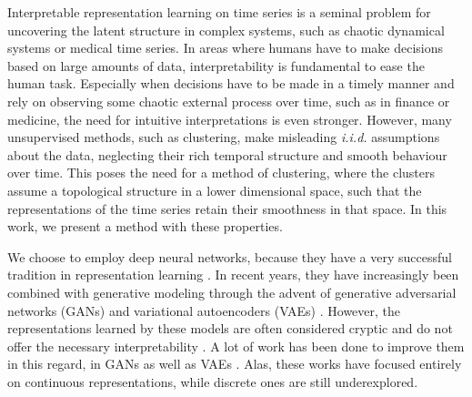 Interpretable representation learning on time series is a seminal problem for uncovering the latent structure in complex systems, such as chaotic dynamical systems or medical time series.
In areas where humans have to make decisions based on large amounts of data, interpretability is fundamental to ease the human task.
Especially when decisions have to be made in a timely manner and rely on observing some chaotic external process over time, such as in finance or medicine, the need for intuitive interpretations is even stronger.
However, many unsupervised methods, such as clustering, make misleading \emph{i.i.d.} assumptions about the data, neglecting their rich temporal structure and smooth behaviour over time.
This poses the need for a method of clustering, where the clusters assume a topological structure in a lower dimensional space, such that the representations of the time series retain their smoothness in that space.
In this work, we present a method with these properties.

We choose to employ deep neural networks, because they have a very successful tradition in representation learning \citep{Bengio2012}.
In recent years, they have increasingly been combined with generative modeling through the advent of generative adversarial networks (GANs) \citep{Goodfellow2014} and variational autoencoders (VAEs) \citep{Kingma2013}.
However, the representations learned by these models are often considered cryptic and do not offer the necessary interpretability \citep{Chen2016a}.
A lot of work has been done to improve them in this regard, in GANs \citep{Chen2016a} as well as VAEs \citep{Higgins2017, Esmaeili2018}.
Alas, these works have focused entirely on continuous representations, while discrete ones are still underexplored.

